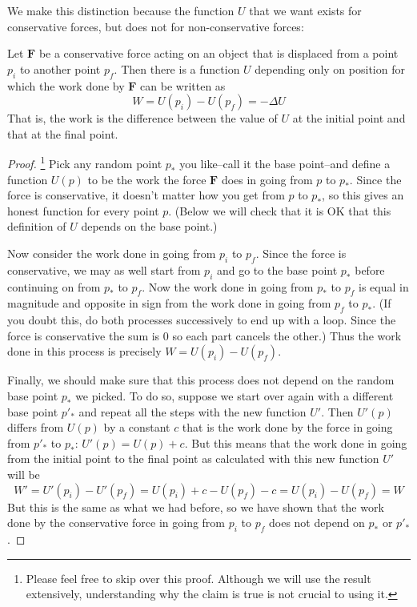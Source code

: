 We make this distinction because the function $U$ that we want exists for conservative forces, but does not for non-conservative forces:
\begin{theorem}
\label{Th:PotentialEnergy}
Let $𝐅$ be a conservative force acting on an object that is displaced from a point $p_i$ to another point $p_f$. Then there is a function $U$ depending only on position for which the work done by $𝐅$ can be written as 
$$
W = U(p_i) - U(p_f) = -ΔU
$$
That is, the work is the difference between the value of $U$ at the initial point and that at the final point. 
\end{theorem}
\begin{proof}\footnote{Please feel free to skip over this proof. Although we will use the result extensively, understanding why the claim is true is not crucial to using it.}
Pick any random point $p_*$ you like--call it the base point--and define a function $U(p)$ to be the work the force $𝐅$ does in going from $p$ to $p_*$. Since the force is conservative, it doesn't matter how you get from $p$ to $p_*$, so this gives an honest function for every point $p$. (Below we will check that it is OK that this definition of $U$ depends on the base point.)

Now consider the work done in going from $p_i$ to $p_f$. Since the force is conservative, we may as well start from $p_i$ and go to the base point $p_*$ before continuing on from $p_*$ to $p_f$. Now the work done in going from $p_*$ to $p_f$ is equal in magnitude and opposite in sign from the work done in going from $p_f$ to $p_*$. (If you doubt this, do both processes successively to end up with a loop. Since the force is conservative the sum is 0 so each part cancels the other.)
Thus the work done in this process is precisely $W = U(p_i) - U(p_f)$.

Finally, we should make sure that this process does not depend on the random base point $p_*$ we picked. To do so, suppose we start over again with a different base point $p'_*$ and repeat all the steps with the new function $U'$. Then $U'(p)$ differs from $U(p)$ by a constant $c$ that is the work done by the force in going from $p'_*$ to $p_*$: $U'(p) = U(p) + c$. But this means that the work done in going from the initial point to the final point as calculated with this new function $U'$ will be
$$
W' = U'(p_i) - U'(p_f) = U(p_i) + c - U(p_f) -c  = U(p_i) - U(p_f)= W
$$
But this is the same as what we had before, so we have shown that the work done by the conservative force in going from $p_i$ to $p_f$ does not depend on $p_*$ or $p'_*$. 
\end{proof}
